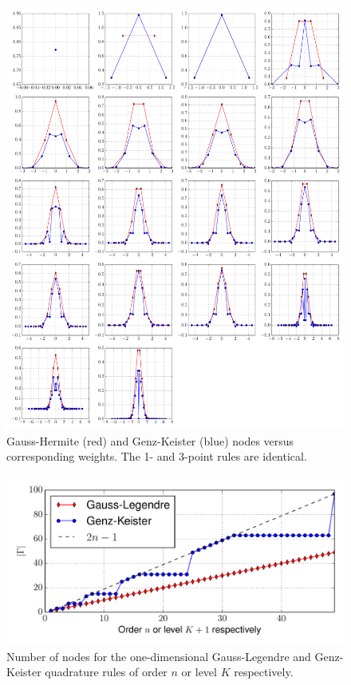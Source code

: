 \documentclass[a4paper,10pt]{article}
\begin{document}
\begin{figure}[h]
  \centering
  \includegraphics[width=\linewidth]{./img/gk_hermitephy_nodes_1d.pdf}
  \caption{Gauss-Hermite (red) and Genz-Keister (blue) nodes versus
  corresponding weights. The 1- and 3-point rules are identical.}
  \label{fig:gk_hermitephy_nodes_1d}
\end{figure}


\begin{figure}
  \centering
  \includegraphics[width=\linewidth]{./img/number_nodes_legendre.pdf}
  \caption{Number of nodes for the one-dimensional Gauss-Legendre and Genz-Keister quadrature
  rules of order $n$ or level $K$ respectively.}
  \label{fig:number_nodes_legendre}
\end{figure}
\end{document}
